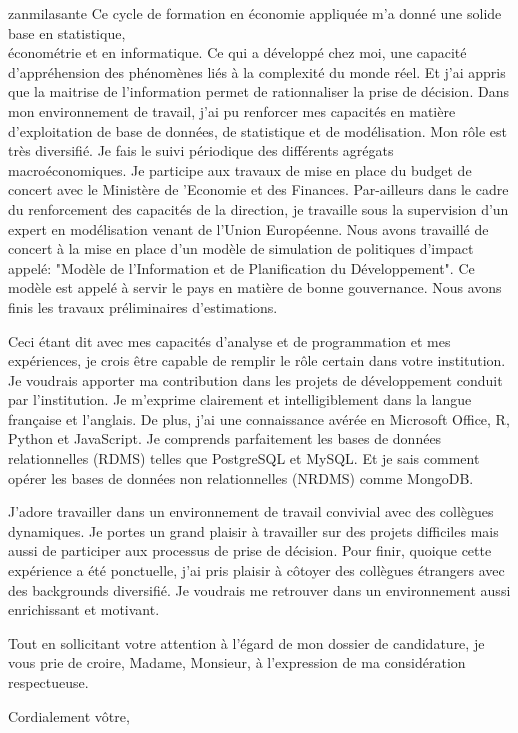 \documentclass[11pt]{letter} %
\begin{document}
\begin{letter}{zanmilasante}
	Ce cycle de formation en économie appliquée m’a donné une solide base en statistique, \\
	économétrie et en informatique. Ce qui a développé chez moi, une capacité d’appréhension des phénomènes liés à la complexité du monde réel. Et j’ai appris que la maitrise de l’information permet de rationnaliser la prise de décision. Dans mon environnement de travail, j’ai pu renforcer mes capacités en matière d’exploitation de base de données, de statistique et de modélisation. Mon rôle est très diversifié. Je fais le suivi périodique des différents agrégats macroéconomiques. Je participe aux travaux de mise en place du budget de concert avec le Ministère de ’Economie et des Finances. Par-ailleurs dans le cadre du renforcement des capacités de la direction, je travaille sous la supervision d’un expert en modélisation venant de l’Union Européenne. Nous avons travaillé de concert à la mise en place d’un modèle de simulation de politiques d’impact appelé: "Modèle de l’Information et de Planification du Développement". Ce modèle est appelé à servir le pays en matière de bonne gouvernance. Nous avons finis les travaux préliminaires d’estimations.
	
	Ceci étant dit avec mes capacités d’analyse et de programmation et mes expériences, je crois être capable de remplir le rôle certain dans votre institution. Je voudrais apporter ma contribution dans les projets de développement conduit par l’institution. Je m’exprime clairement et intelligiblement dans la langue française et l’anglais. De plus, j’ai une connaissance avérée en Microsoft Office, R, Python et JavaScript. Je comprends parfaitement les bases de données relationnelles (RDMS) telles que PostgreSQL et MySQL. Et je sais comment opérer les bases de données non relationnelles (NRDMS) comme MongoDB.
	
	J’adore travailler dans un environnement de travail convivial avec des collègues dynamiques. Je portes un grand plaisir à travailler sur des projets difficiles mais aussi de participer aux processus de prise de décision. Pour finir, quoique cette expérience a été ponctuelle, j’ai pris plaisir à côtoyer des collègues étrangers avec des backgrounds diversifié. Je voudrais me retrouver dans un environnement aussi enrichissant et motivant.
	
	
	Tout en sollicitant votre attention à l’égard de mon dossier de candidature, je vous prie de croire, Madame, Monsieur, à l’expression de ma considération respectueuse.

 


\closing{Cordialement v\^{o}tre,}




\end{letter}
\end{document}

